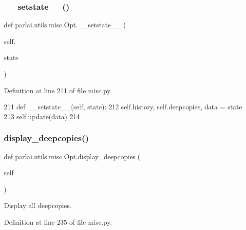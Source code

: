\subsubsection{\texorpdfstring{\+\_\+\+\_\+setstate\+\_\+\+\_\+()}{\_\_setstate\_\_()}}
{\footnotesize\ttfamily def parlai.\+utils.\+misc.\+Opt.\+\_\+\+\_\+setstate\+\_\+\+\_\+ (\begin{DoxyParamCaption}\item[{}]{self,  }\item[{}]{state }\end{DoxyParamCaption})}



Definition at line 211 of file misc.\+py.


\begin{DoxyCode}
211     \textcolor{keyword}{def }\_\_setstate\_\_(self, state):
212         self.history, self.deepcopies, data = state
213         self.update(data)
214 
\end{DoxyCode}
\mbox{\label{classparlai_1_1utils_1_1misc_1_1Opt_aef6b123f77613b7e3ecc45716de89ee2}} 
\subsubsection{\texorpdfstring{display\+\_\+deepcopies()}{display\_deepcopies()}}
{\footnotesize\ttfamily def parlai.\+utils.\+misc.\+Opt.\+display\+\_\+deepcopies (\begin{DoxyParamCaption}\item[{}]{self }\end{DoxyParamCaption})}

\begin{DoxyVerb}Display all deepcopies.
\end{DoxyVerb}
 

Definition at line 235 of file misc.\+py.


